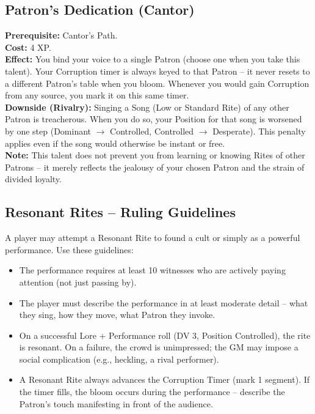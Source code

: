 \subsection*{Patron's Dedication (Cantor)}
\label{talent:patron_dedication}
\textbf{Prerequisite:} Cantor's Path. \\
\textbf{Cost:} 4 XP. \\
\textbf{Effect:} You bind your voice to a single Patron (choose one when you take this talent). Your Corruption timer is always keyed to that Patron -- it never resets to a different Patron's table when you bloom. Whenever you would gain Corruption from any source, you mark it on this same timer. \\
\textbf{Downside (Rivalry):} Singing a Song (Low or Standard Rite) of any other Patron is treacherous. When you do so, your Position for that song is worsened by one step (Dominant $\rightarrow$ Controlled, Controlled $\rightarrow$ Desperate). This penalty applies even if the song would otherwise be instant or free. \\
\textbf{Note:} This talent does not prevent you from learning or knowing Rites of other Patrons -- it merely reflects the jealousy of your chosen Patron and the strain of divided loyalty.

\subsection*{Resonant Rites -- Ruling Guidelines}
\label{subsec:resonant-rites-gm}
A player may attempt a Resonant Rite to found a cult or simply as a powerful performance. Use these guidelines:
\begin{itemize}
  \item The performance requires at least 10 witnesses who are actively paying attention (not just passing by).
  \item The player must describe the performance in at least moderate detail -- what they sing, how they move, what Patron they invoke.
  \item On a successful Lore + Performance roll (DV 3, Position Controlled), the rite is resonant. On a failure, the crowd is unimpressed; the GM may impose a social complication (e.g., heckling, a rival performer).
  \item A Resonant Rite always advances the Corruption Timer (mark 1 segment). If the timer fills, the bloom occurs during the performance -- describe the Patron's touch manifesting in front of the audience.
\end{itemize}

